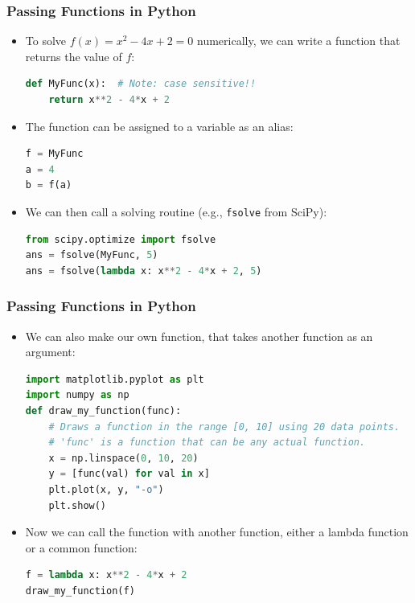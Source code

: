   \begin{frame}[fragile]
    \frametitle{Passing Functions in Python}
  
    \begin{itemize}
      \item To solve \( f(x) = x^2 - 4x + 2 = 0 \) numerically, we can write a function that returns the value of \( f \):
      \begin{lstlisting}[language=Python]
def MyFunc(x):  # Note: case sensitive!!
    return x**2 - 4*x + 2
      \end{lstlisting}
      
      \item The function can be assigned to a variable as an alias:
      \begin{lstlisting}[language=Python]
f = MyFunc
a = 4
b = f(a)
      \end{lstlisting}
    
      \item We can then call a solving routine (e.g., \texttt{fsolve} from SciPy):
      \begin{lstlisting}[language=Python]
from scipy.optimize import fsolve
ans = fsolve(MyFunc, 5)
ans = fsolve(lambda x: x**2 - 4*x + 2, 5)
      \end{lstlisting}
    \end{itemize}
    
  \end{frame}
  
  \begin{frame}[fragile]
    \frametitle{Passing Functions in Python}
  
    \begin{itemize}
      \item We can also make our own function, that takes another function as an argument:
      \begin{lstlisting}[language=Python]
import matplotlib.pyplot as plt
import numpy as np
def draw_my_function(func):
    # Draws a function in the range [0, 10] using 20 data points.
    # 'func' is a function that can be any actual function.
    x = np.linspace(0, 10, 20)
    y = [func(val) for val in x]
    plt.plot(x, y, "-o")
    plt.show()
      \end{lstlisting}
  
      \item Now we can call the function with another function, either a lambda function or a common function:
      \begin{lstlisting}[language=Python]
f = lambda x: x**2 - 4*x + 2
draw_my_function(f)
      \end{lstlisting}
    \end{itemize}
  \end{frame}
  
